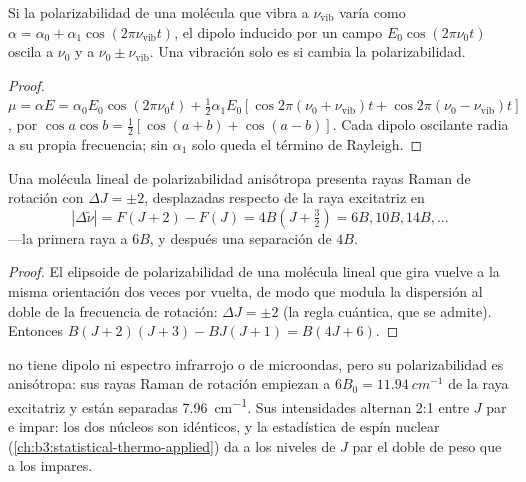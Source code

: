 \begin{proposition}\label{prop:b3:rovibrational-spectroscopy:raman-classical}
Si la polarizabilidad de una molécula que vibra a $\nu_{\mathrm{vib}}$ varía
como $\alpha = \alpha_0 + \alpha_1\cos(2\pi\nu_{\mathrm{vib}}t)$, el dipolo inducido por un
campo $E_0\cos(2\pi\nu_0t)$ oscila a $\nu_0$ y a $\nu_0 \pm \nu_{\mathrm{vib}}$.
Una vibración solo es  si cambia la polarizabilidad.
\end{proposition}

\begin{proof}
$\mu = \alpha E = \alpha_0E_0\cos(2\pi\nu_0t) + \frac12\alpha_1E_0[\cos2\pi(\nu_0 +
\nu_{\mathrm{vib}})t + \cos2\pi(\nu_0 - \nu_{\mathrm{vib}})t]$, por $\cos a\cos b =
\frac12[\cos(a+b) + \cos(a-b)]$. Cada dipolo oscilante radia a su propia
frecuencia; sin $\alpha_1$ solo queda el término de Rayleigh.
\end{proof}

\begin{proposition}\label{prop:b3:rovibrational-spectroscopy:rotational-raman}
Una molécula lineal de polarizabilidad anisótropa presenta rayas Raman de rotación
con $\Delta J = \pm2$, desplazadas respecto de la raya excitatriz en
\[
|\Delta\tilde\nu| = F(J+2) - F(J) = 4B(J + \tfrac32) = 6B, 10B, 14B, \dots
\]
---la primera raya a $6B$, y después una separación de $4B$.
\end{proposition}

\begin{proof}
El elipsoide de polarizabilidad de una molécula lineal que gira vuelve a la
misma orientación dos veces por vuelta, de modo que modula la dispersión al doble de
la frecuencia de rotación: $\Delta J = \pm2$ (la regla cuántica, que se admite). Entonces
$B(J+2)(J+3) - BJ(J+1) = B(4J + 6)$.
\end{proof}

\begin{example}\label{ex:b3:rovibrational-spectroscopy:n2}
 no tiene dipolo ni espectro infrarrojo o de microondas, pero su
polarizabilidad es anisótropa: sus rayas Raman de rotación empiezan a $6B_0 =
\qty{11.94}{cm^{-1}}$ de la raya excitatriz y están separadas \qty{7.96}{cm^{-1}}. Sus
intensidades alternan 2:1 entre $J$ par e impar: los dos núcleos  son
idénticos, y la estadística de espín nuclear (\cref{ch:b3:statistical-thermo-applied})
da a los niveles de $J$ par el doble de peso que a los impares.
\end{example}


